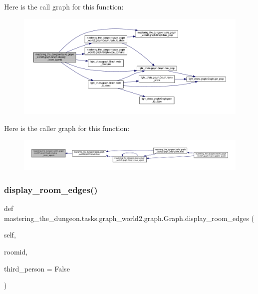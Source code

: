 Here is the call graph for this function\+:
\nopagebreak
\begin{figure}[H]
\begin{center}
\leavevmode
\includegraphics[width=350pt]{classmastering__the__dungeon_1_1tasks_1_1graph__world2_1_1graph_1_1Graph_aada7beb45751c1432f1b5056bfd927e7_cgraph}
\end{center}
\end{figure}
Here is the caller graph for this function\+:
\nopagebreak
\begin{figure}[H]
\begin{center}
\leavevmode
\includegraphics[width=350pt]{classmastering__the__dungeon_1_1tasks_1_1graph__world2_1_1graph_1_1Graph_aada7beb45751c1432f1b5056bfd927e7_icgraph}
\end{center}
\end{figure}
\mbox{\label{classmastering__the__dungeon_1_1tasks_1_1graph__world2_1_1graph_1_1Graph_ac0e5e4ffa325ec4c63f0f26d055c2e23}} 
\subsubsection{\texorpdfstring{display\+\_\+room\+\_\+edges()}{display\_room\_edges()}}
{\footnotesize\ttfamily def mastering\+\_\+the\+\_\+dungeon.\+tasks.\+graph\+\_\+world2.\+graph.\+Graph.\+display\+\_\+room\+\_\+edges (\begin{DoxyParamCaption}\item[{}]{self,  }\item[{}]{roomid,  }\item[{}]{third\+\_\+person = {\ttfamily False} }\end{DoxyParamCaption})}




